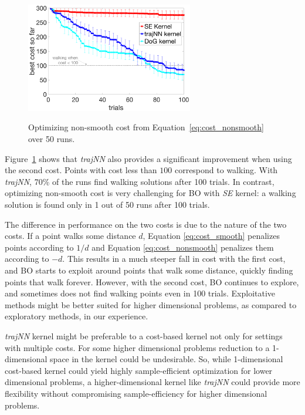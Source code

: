 \begin{figure}[t]
\centering
\caption{Optimizing non-smooth cost from Equation~\ref{eq:cost_nonsmooth} over 50 runs.}
\includegraphics[width=0.65\textwidth]{img/nonsmooth_cost_bo_runs}
\label{fig:nonsmooth_cost_bo_runs}
\end{figure}

Figure~\ref{fig:nonsmooth_cost_bo_runs} shows that \textit{trajNN} also provides a significant improvement when using the second cost. Points with cost less than $100$ correspond to walking. With \textit{trajNN}, 70\% of the runs find walking solutions after 100 trials. In contrast, optimizing non-smooth cost is very challenging for BO with \textit{SE} kernel: a walking solution is found only in 1 out of 50 runs after 100 trials.

The difference in performance on the two costs is due to the nature of the two costs. If a point walks some distance $d$, Equation \ref{eq:cost_smooth} penalizes points according to $1/d$ and Equation \ref{eq:cost_nonsmooth} penalizes them according to $-d$. This results in a much steeper fall in cost with the first cost, and BO starts to exploit around points that walk some distance, quickly finding points that walk forever. However, with the second cost, BO continues to explore, and sometimes does not find walking points even in 100 trials. Exploitative methods might be better suited for higher dimensional problems, as compared to exploratory methods, in our experience. 

\textit{trajNN} kernel might be preferable to a cost-based kernel not only for settings with multiple costs. For some higher dimensional problems reduction to a 1-dimensional space in the kernel could be undesirable. So, while 1-dimensional cost-based kernel could yield highly sample-efficient optimization for lower dimensional problems, a higher-dimensional kernel like \textit{trajNN} could provide more flexibility without compromising sample-efficiency for higher dimensional problems.

